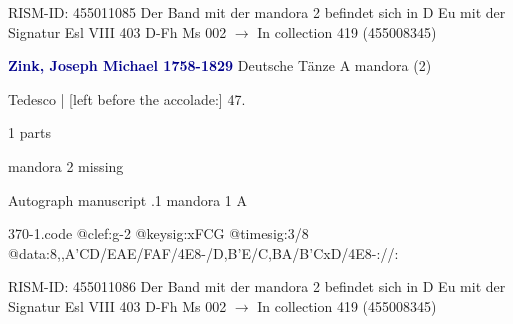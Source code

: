 \documentclass[twocolumn]{book}
\begin{document}
\newline RISM-ID: 455011085
\newline Der Band mit der mandora 2 befindet sich in D Eu mit der Signatur Esl VIII 403
\newline D-Fh  Ms 002
\newline $\rightarrow$ In collection 419 (455008345)

\newline \par \vspace{7pt} \textcolor{darkblue}{\textbf{Zink, Joseph Michael  1758-1829}}
\newline Deutsche Tänze  A  
\newline mandora (2)
\newline \begin{itshape}[f.26r, at left:] Tedesco | [left before the accolade:] 47.\end{itshape} 
\newline \textcolor{darkblue}{}  1 parts  
\newline \begin{small} mandora 2 missing\end{small} 
\newline Autograph manuscript
.1  mandora 1  A  
\begin{filecontents*}{370-1.code}
@clef:g-2
@keysig:xFCG
@timesig:3/8
@data:8,,A'CD/EAE/FAF/4E8-/D,B'E/C,BA/B'CxD/4E8-://:
\end{filecontents*}
\newline
%

\newline RISM-ID: 455011086
\newline Der Band mit der mandora 2 befindet sich in D Eu mit der Signatur Esl VIII 403
\newline D-Fh  Ms 002
\newline $\rightarrow$ In collection 419 (455008345)
\end{document}
